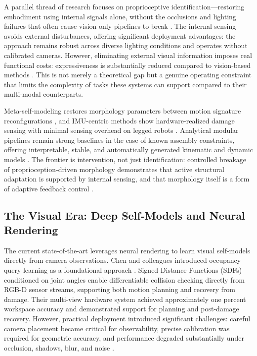 \documentclass[12pt,a4paper,oneside]{report}
\begin{document}
A parallel thread of research focuses on proprioceptive identification—restoring embodiment using internal signals alone, without the occlusions and lighting failures that often cause vision-only pipelines to break \cite{hu2024reconfigurable}. The internal sensing avoids external disturbances, offering significant deployment advantages: the approach remains robust across diverse lighting conditions and operates without calibrated cameras. However, eliminating external visual information imposes real functional costs: expressiveness is substantially reduced compared to vision-based methods \cite{farghdani2025robust}. This is not merely a theoretical gap but a genuine operating constraint that limits the complexity of tasks these systems can support compared to their multi-modal counterparts.

Meta-self-modeling restores morphology parameters between motion signature reconfigurations \cite{hu2024reconfigurable}, and IMU-centric methods show hardware-realized damage sensing with minimal sensing overhead on legged robots \cite{farghdani2025robust}. Analytical modular pipelines remain strong baselines in the case of known assembly constraints, offering interpretable, stable, and automatically generated kinematic and dynamic models \cite{dogra2022unified}. The frontier is intervention, not just identification: controlled breakage of proprioception-driven morphology demonstrates that active structural adaptation is supported by internal sensing, and that morphology itself is a form of adaptive feedback control \cite{xu2026antenna, yu2026kinematicself}.

\subsection{The Visual Era: Deep Self-Models and Neural Rendering}

The current state-of-the-art leverages neural rendering to learn visual self-models directly from camera observations. Chen and colleagues introduced occupancy query learning as a foundational approach \cite{chen2022full}. Signed Distance Functions (SDFs) conditioned on joint angles enable differentiable collision checking directly from RGB-D sensor streams, supporting both motion planning and recovery from damage. Their multi-view hardware system achieved approximately one percent workspace accuracy and demonstrated support for planning and post-damage recovery. However, practical deployment introduced significant challenges: careful camera placement became critical for observability, precise calibration was required for geometric accuracy, and performance degraded substantially under occlusion, shadows, blur, and noise \cite{chen2022full}.
\end{document}
